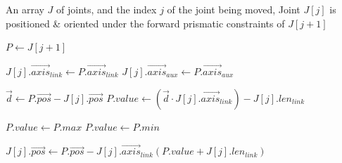 \begin{algorithm}[h!]
\caption{Move Joint under Forward Prismatic Constraints}
\label{alg:move_prismatic}
\normalsize{
\begin{algorithmic}[1]
    \Require An array $J$ of joints, and the index $j$ of the joint being moved,
    \Ensure Joint $J[j]$ is positioned \& oriented under the forward prismatic constraints of $J[j+1]$

        \State $P\gets J[j+1]$
        \Statex

        \State $J[j].\vec{axis}_{link}\gets P.\vec{axis}_{link}$
        \State $J[j].\vec{axis}_{aux}\gets P.\vec{axis}_{aux}$
        \Statex

        \State $\vec{d}\gets P.\vec{pos}-J[j].\vec{pos}$
        \State $P.value\gets(\vec{d}\cdot J[j].\vec{axis}_{link})-J[j].len_{link}$
        \Statex

                \State $P.value\gets P.max$
                \State $P.value\gets P.min$
            \EndIf
        \EndIf
        \Statex
        
        \State $J[j].\vec{pos}\gets P.\vec{pos}-J[j].\vec{axis}_{link}(P.value+J[j].len_{link})$
    \EndFunction
\end{algorithmic}
}
\end{algorithm}
